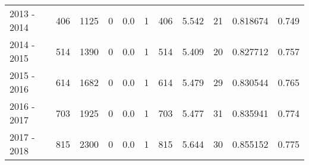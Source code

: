 \begin{tabular}{lrrrrrrrllr}
2013 - 2014 &      406 &     1125 &                 0 &               0.0 &                       1 &                        406 &       5.542 &            21 &   0.818674 &             0.749 \\
2014 - 2015 &      514 &     1390 &                 0 &               0.0 &                       1 &                        514 &       5.409 &            20 &   0.827712 &             0.757 \\
2015 - 2016 &      614 &     1682 &                 0 &               0.0 &                       1 &                        614 &       5.479 &            29 &   0.830544 &             0.765 \\
2016 - 2017 &      703 &     1925 &                 0 &               0.0 &                       1 &                        703 &       5.477 &            31 &   0.835941 &             0.774 \\
2017 - 2018 &      815 &     2300 &                 0 &               0.0 &                       1 &                        815 &       5.644 &            30 &   0.855152 &             0.775 \\
\bottomrule
\end{tabular}
